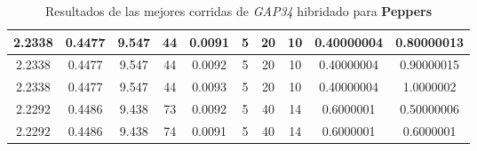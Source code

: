\begin{table}[h!]
\begin{center}
\begin{tabular}{|c|c|c|c|c|c|c|c|c|c|}
        \hline
        \hline
            2.2338 & 0.4477  & 9.547 & 44 & 0.0091 & 5 & 20 & 10 & 0.40000004 & 0.80000013\\
        \hline
        \hline
            2.2338 & 0.4477  & 9.547 & 44 & 0.0092 & 5 & 20 & 10 & 0.40000004 & 0.90000015\\
        \hline
        \hline
            2.2338 & 0.4477  & 9.547 & 44 & 0.0093 & 5 & 20 & 10 & 0.40000004 & 1.0000002\\
        \hline
        \hline
            2.2292 & 0.4486  & 9.438 & 73 & 0.0092 & 5 & 40 & 14 & 0.6000001 & 0.50000006\\
        \hline
        \hline
            2.2292 & 0.4486  & 9.438 & 74 & 0.0091 & 5 & 40 & 14 & 0.6000001 & 0.6000001\\
        \hline
        \end{tabular}
        \caption{Resultados de las mejores corridas de \emph{GAP34} hibridado para {\bf Peppers}}
        \label{tb:tableGAP34}
    \end{center}
\end{table}

